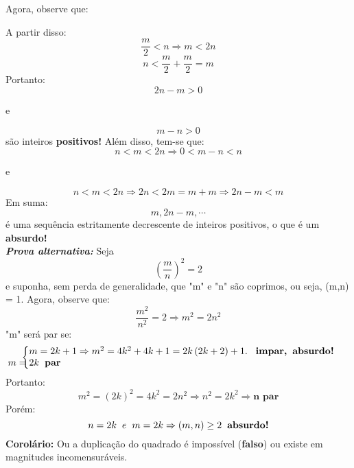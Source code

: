 \documentclass[12pt]{article}
\begin{document}
Agora, observe que:
\begin{center}
    



\end{center}
\newpage
A partir disso: \[\frac{m}{2}<n\Rightarrow m<2n\] \[n<\frac{m}{2}+\frac{m}{2}=m\]
Portanto: \[2n-m>0 \]
\begin{center}
    e
\end{center} \[m-n>0 \]
são inteiros \textbf{positivos!} Além disso, tem-se que: \[n<m<2n\Rightarrow 0<m-n<n\]
\begin{center}
    e
\end{center}
\[n<m<2n\Rightarrow 2n<2m=m+m\Rightarrow 2n-m<m\]
Em suma: \[m,2n-m,\cdots \] é uma sequência estritamente decrescente de inteiros positivos, o que é um \textbf{absurdo!} \\

\textbf{\textit{Prova alternativa:}} Seja \[\left(\frac{m}{n}\right)^2=2\] e suponha, sem perda de generalidade, que "m" e "n" são coprimos, ou seja, (m,n) = 1.
\newpage
Agora, observe que: \[\frac{m^2}{n^2}=2\Rightarrow m^2=2n^2\]
"m" será par se: \[\left\{\begin{matrix}m=2k+1\Rightarrow m^2=4k^2+4k+1=2k\left(2k+2\right)+1.\hspace{0.3cm}\textbf{impar,\hspace{0.2cm}absurdo!}\\\hspace{-10.8cm}m=2k\hspace{0.2cm}\textbf{par}\end{matrix}\right.\]
Portanto: \[m^2=\left(2k\right)^2=4k^2=2n^2\Rightarrow n^2=2k^2\Rightarrow\textbf{n par}\]
Porém:
\[n=2k\hspace{0.2cm}e\hspace{0.2cm}m=2k\Rightarrow(m,n)\geq 2\hspace{0.2cm}\textbf{absurdo!}\]
\textbf{Corolário:} Ou a duplicação do quadrado é impossível (\textbf{falso}) ou existe em magnitudes incomensuráveis.
\end{document}
